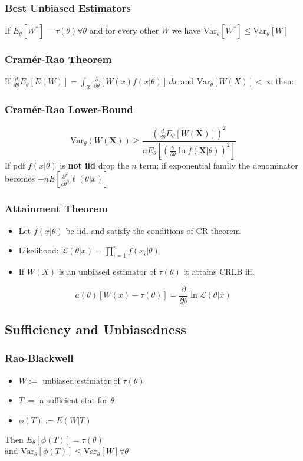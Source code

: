 		\subsubsection{Best Unbiased Estimators}
			If \(E_\theta[W^*] = \tau(\theta) \forall\theta\) 
			and for every other \(W\) we have \(\text{Var}_\theta[W^*]\leq\text{Var}_\theta[W]\)
		
		\subsubsection{Cram\'er-Rao Theorem}
			If 
			\(\frac{d}{d\theta}E_\theta[E(W)] = \int_{\mathcal{X}}\frac{\partial}{\partial\theta}\left[W(x)f(x|\theta)\right]\,dx\)
			and
			\(\text{Var}_\theta[W(X)]<\infty\)
			then:
		
		\subsubsection{Cram\'er-Rao Lower-Bound}
			\[\text{Var}_\theta(W(\mathbf{X}))\geq \frac{\left(\frac{d}{d\theta}E_\theta[W(\mathbf{X})]\right)^2}{
				nE_\theta\left[ \left(\frac{\partial}{\partial\theta}\ln f(\mathbf{X}|\theta)\right)^2 \right]}\]
			If pdf \(f(x|\theta)\) is \textbf{not iid} drop the \(n\) term;
			if exponential family the denominator becomes
			\(-nE\left[\frac{\partial^2}{\partial\theta^2} \ell(\theta|x) \right]\)
			
		\subsubsection{Attainment Theorem}
			\begin{itemize}
				\item Let \(f(x|\theta)\) be iid. and satisfy the conditions of CR theorem
				\item Likelihood: \(\mathcal{L}(\theta|x) = \prod_{i=1}^nf(x_i|\theta)\)
				\item If \(W(X)\) is an unbiased estimator of \(\tau(\theta)\) it attains CRLB iff.
			\end{itemize}
			\[a(\theta)\left[W(x)-\tau(\theta)\right] = \frac{\partial}{\partial\theta}\ln\mathcal{L}(\theta|x)\]
			
	\subsection{Sufficiency and Unbiasedness}
		\subsubsection{Rao-Blackwell}
			\begin{itemize}
				\item \(W:=\) unbiased estimator of \(\tau(\theta)\)
				\item \(T:=\) a sufficient stat for \(\theta\)
				\item \(\phi(T):=E(W|T)\)
			\end{itemize}
			Then \(E_\theta[\phi(T)] = \tau(\theta)\) \\
			and \(\text{Var}_\theta[\phi(T)] \leq \text{Var}_\theta[W] \forall \theta\)
			
